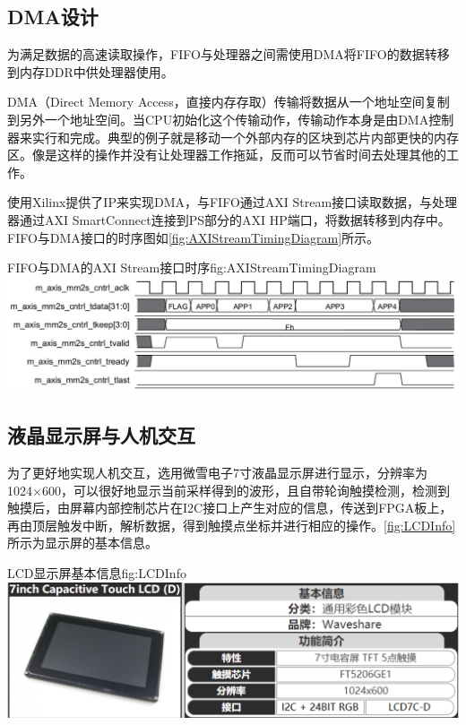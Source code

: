 \documentclass[supercite]{HustGraduPaper}
\begin{document}
	\subsection{DMA设计}
	为满足数据的高速读取操作，FIFO与处理器之间需使用DMA将FIFO的数据转移到内存DDR中供处理器使用。
	
	DMA（Direct Memory Access，直接内存存取）传输将数据从一个地址空间复制到另外一个地址空间。当CPU初始化这个传输动作，传输动作本身是由DMA控制器来实行和完成。典型的例子就是移动一个外部内存的区块到芯片内部更快的内存区。像是这样的操作并没有让处理器工作拖延，反而可以节省时间去处理其他的工作。
	
	使用Xilinx提供了IP来实现DMA，与FIFO通过AXI Stream接口读取数据，与处理器通过AXI SmartConnect连接到PS部分的AXI HP端口，将数据转移到内存中。FIFO与DMA接口的时序图如\autoref{fig:AXIStreamTimingDiagram}所示。
	
	\begin{generalfig}[htb]{FIFO与DMA的AXI Stream接口时序}{fig:AXIStreamTimingDiagram}
		\includegraphics[width=\textwidth]{Figures/AXIStreamTimingDiagram.JPG}
	\end{generalfig}
	
	\subsection{液晶显示屏与人机交互}
	
	为了更好地实现人机交互，选用微雪电子7寸液晶显示屏进行显示，分辨率为1024×600，可以很好地显示当前采样得到的波形，且自带轮询触摸检测，检测到触摸后，由屏幕内部控制芯片在I2C接口上产生对应的信息，传送到FPGA板上，再由顶层触发中断，解析数据，得到触摸点坐标并进行相应的操作。\autoref{fig:LCDInfo}所示为显示屏的基本信息。
	
	\begin{generalfig}[htb]{LCD显示屏基本信息}{fig:LCDInfo}
		\includegraphics[width=\textwidth]{Figures/LCDInfo.PNG}
	\end{generalfig}
	
\end{document}
